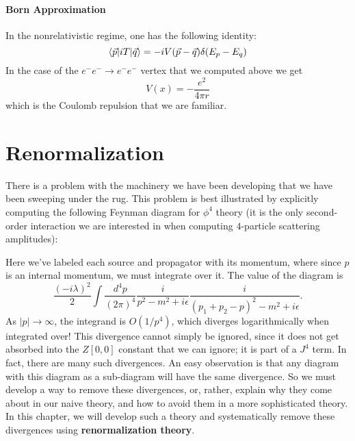 \documentclass{report}
\theoremstyle{plain}
\theoremstyle{definition}
\theoremstyle{remark}
\newcommand{\FR}[2]{\frac{#1}{#2}}
\begin{document}
\subsubsection{Born Approximation}
In the nonrelativistic regime, one has the following identity:
\[ \braket{\vec p|iT|\vec q} =-i V(\vec p-\vec q)\delta(E_p-E_q) \]
In the case of the $e^-e^- \to e^-e^-$ vertex that we computed above we get 
\[ V(x) = -\FR{e^2}{4\pi r} \]
which is the Coulomb repulsion that we are familiar.

\chapter{Renormalization}

There is a problem with the machinery we have been developing that we
have been sweeping under the rug. This problem is best illustrated by
explicitly computing the following Feynman diagram for $\phi^4$ theory
(it is the only second-order interaction we are interested in when
computing $4$-particle scattering amplitudes):
\begin{center}
\end{center}
Here we've labeled each source and propagator with its momentum, where
since $p$ is an internal momentum, we must integrate over it. The
value of the diagram is
$$ \frac{(-i\lambda)^2}{2} \int \frac{d^4p}{(2\pi)^4} \frac{i}{p^2 - m^2 + i\epsilon} \frac{i}{(p_1 + p_2 - p)^2 - m^2 + i\epsilon}. $$
As $|p| \to \infty$, the integrand is $O(1/p^4)$, which diverges
logarithmically when integrated over! This divergence cannot simply be
ignored, since it does not get absorbed into the $Z[0,0]$ constant
that we can ignore; it is part of a $J^4$ term. In fact, there are
many such divergences. An easy observation is that any diagram with
this diagram as a sub-diagram will have the same divergence. So we
must develop a way to remove these divergences, or, rather, explain
why they come about in our naive theory, and how to avoid them in a
more sophisticated theory. In this chapter, we will develop such a
theory and systematically remove these divergences using {\bf
  renormalization theory}.
\end{document}
